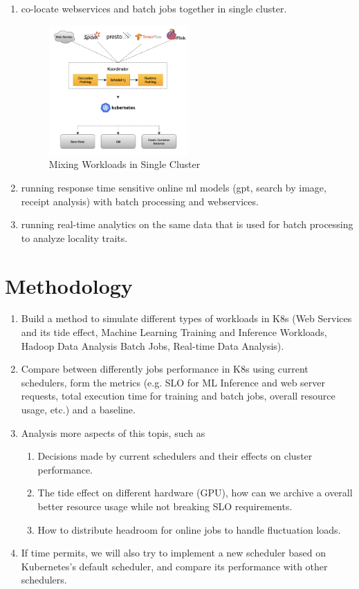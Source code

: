 \documentclass[pdftex,twocolumn,10pt,letterpaper]{article}
\begin{document}
\begin{enumerate}
	\item co-locate webservices and batch jobs together in single cluster.
	      \begin{figure}[h]
		      \centering
		      \includegraphics[width=0.5\textwidth]{fig/koo-arch.png}
		      \caption{Mixing Workloads in Single Cluster \cite{koo}}
	      \end{figure}
	\item running response time sensitive online ml models (gpt, search by image, receipt analysis) with batch processing and webservices.
	\item running real-time analytics on the same data that is used for batch processing to analyze locality traits.
\end{enumerate}

\section*{Methodology}

\begin{enumerate}
	\item Build a method to simulate different types of workloads in K8s (Web Services and its tide effect, Machine Learning Training and Inference Workloads, Hadoop Data Analysis Batch Jobs, Real-time Data Analysis).
	\item Compare between differently jobs performance in K8s using current schedulers, form the metrics (e.g. SLO for ML Inference and web server requests, total execution time for training and batch jobs, overall resource usage, etc.) and a baseline.
	\item Analysis more aspects of this topis, such as
	      \begin{enumerate}
		      \item Decisions made by current schedulers and their effects on cluster performance.
		      \item The tide effect on different hardware (GPU), how can we archive a overall better resource usage while not breaking SLO requirements.
		      \item How to distribute headroom for online jobs to handle fluctuation loads.
	      \end{enumerate}
	\item If time permits, we will also try to implement a new scheduler based on Kubernetes's default scheduler, and compare its performance with other schedulers.
\end{enumerate}
\end{document}
